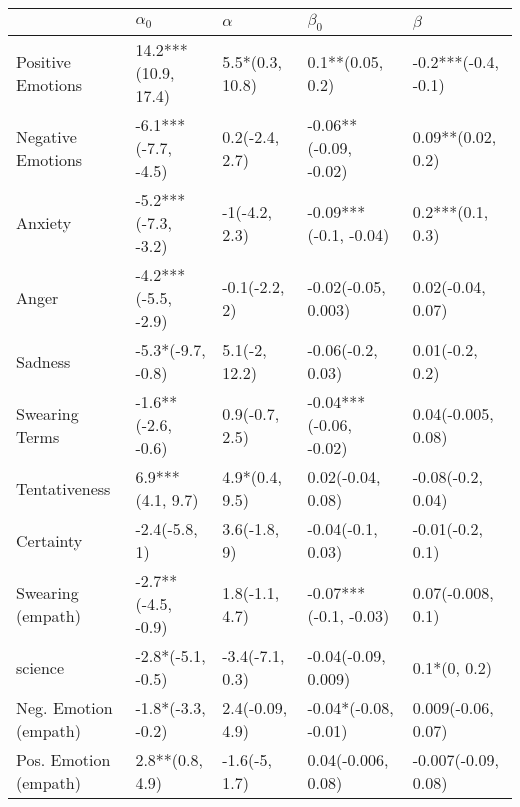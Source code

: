 \begin{tabular}{lllll}
\toprule
{} &           $\alpha_0$ &         $\alpha$ &               $\beta_0$ &              $\beta$ \\
\midrule
Positive Emotions     &  14.2***(10.9, 17.4) &  5.5*(0.3, 10.8) &        0.1**(0.05, 0.2) &  -0.2***(-0.4, -0.1) \\
Negative Emotions     &  -6.1***(-7.7, -4.5) &   0.2(-2.4, 2.7) &   -0.06**(-0.09, -0.02) &    0.09**(0.02, 0.2) \\
Anxiety               &  -5.2***(-7.3, -3.2) &    -1(-4.2, 2.3) &   -0.09***(-0.1, -0.04) &     0.2***(0.1, 0.3) \\
Anger                 &  -4.2***(-5.5, -2.9) &    -0.1(-2.2, 2) &     -0.02(-0.05, 0.003) &    0.02(-0.04, 0.07) \\
Sadness               &    -5.3*(-9.7, -0.8) &    5.1(-2, 12.2) &       -0.06(-0.2, 0.03) &      0.01(-0.2, 0.2) \\
Swearing Terms        &   -1.6**(-2.6, -0.6) &   0.9(-0.7, 2.5) &  -0.04***(-0.06, -0.02) &   0.04(-0.005, 0.08) \\
Tentativeness         &     6.9***(4.1, 9.7) &   4.9*(0.4, 9.5) &       0.02(-0.04, 0.08) &    -0.08(-0.2, 0.04) \\
Certainty             &        -2.4(-5.8, 1) &     3.6(-1.8, 9) &       -0.04(-0.1, 0.03) &     -0.01(-0.2, 0.1) \\
Swearing (empath)     &   -2.7**(-4.5, -0.9) &   1.8(-1.1, 4.7) &   -0.07***(-0.1, -0.03) &    0.07(-0.008, 0.1) \\
science               &    -2.8*(-5.1, -0.5) &  -3.4(-7.1, 0.3) &     -0.04(-0.09, 0.009) &         0.1*(0, 0.2) \\
Neg. Emotion (empath) &    -1.8*(-3.3, -0.2) &  2.4(-0.09, 4.9) &    -0.04*(-0.08, -0.01) &   0.009(-0.06, 0.07) \\
Pos. Emotion (empath) &      2.8**(0.8, 4.9) &    -1.6(-5, 1.7) &      0.04(-0.006, 0.08) &  -0.007(-0.09, 0.08) \\
\bottomrule
\end{tabular}
